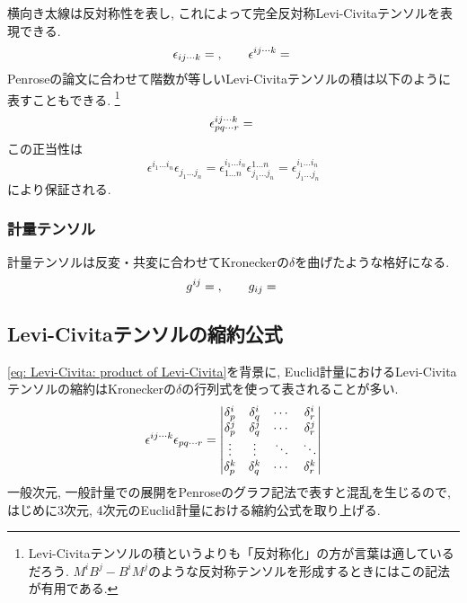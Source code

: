 \documentclass[dvipdfmx]{jsarticle}
\begin{document}
横向き太線は反対称性を表し, これによって完全反対称Levi-Civitaテンソルを表現できる.
\begin{equation*}
    \epsilon_{ij\cdots k}
    =
    \vcenter{\hbox{}},
    \qquad
    \epsilon^{ij\cdots k}
    =
    \vcenter{\hbox{}}
\end{equation*}
Penroseの論文\cite{Penrose article}に合わせて階数が等しいLevi-Civitaテンソルの積は以下のように表すこともできる.
\footnote{Levi-Civitaテンソルの積というよりも「反対称化」の方が言葉は適しているだろう. $M^iB^j-B^iM^j$のような反対称テンソルを形成するときにはこの記法が有用である. }
\begin{equation*}
    \epsilon^{ij\cdots k}_{pq\cdots r}
    =
    \vcenter{\hbox{}}
\end{equation*}
この正当性は
\begin{equation}
    \label{eq: Levi-Civita: product of Levi-Civita}
    \epsilon^{i_1\dots i_n}
    \epsilon_{j_1\dots j_n}
    =
    \epsilon^{i_1\dots i_n}_{1\dots n}
    \epsilon_{j_1\dots j_n}^{1\dots n}
    =
    \epsilon^{i_1\dots i_n}_{j_1\dots j_n}
\end{equation}
により保証される.


\subsubsection{計量テンソル}

計量テンソルは反変・共変に合わせてKroneckerの$\delta$を曲げたような格好になる.
\begin{equation*}
    g^{ij}
    =
    \vcenter{\hbox{}},
    \qquad
    g_{ij}
    =
    \vcenter{\hbox{}}
\end{equation*}


\subsection{Levi-Civitaテンソルの縮約公式}
\label{sec: levicivita: contraction}

\eqref{eq: Levi-Civita: product of Levi-Civita}を背景に, Euclid計量におけるLevi-Civitaテンソルの縮約はKroneckerの$\delta$の行列式を使って表されることが多い.
\begin{equation*}
    \epsilon^{ij\cdots k}\epsilon_{pq\cdots r}
    =
    \mqty|
        \delta^i_p & \delta^i_q & \cdots & \delta^i_r
        \\
        \delta^j_p & \delta^j_q & \cdots & \delta^j_r
        \\
        \vdots & \vdots & \ddots & \ddots
        \\
        \delta^k_p & \delta^k_q & \cdots & \delta^k_r
    |
\end{equation*}
一般次元, 一般計量での展開をPenroseのグラフ記法で表すと混乱を生じるので, はじめに3次元, 4次元のEuclid計量における縮約公式を取り上げる.
\end{document}
